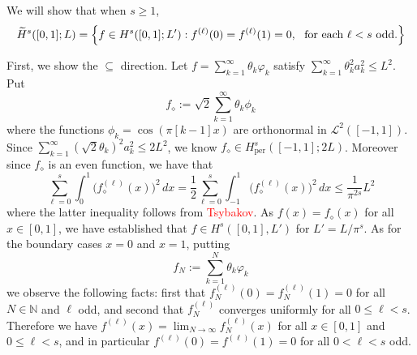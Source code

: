 \documentclass{article}
\newcommand{\1}{\mathbf{1}}
\newcommand{\Nbb}{\mathbb{N}}
\newcommand{\Leb}{\mathcal{L}}
\newcommand{\wt}[1]{\widetilde{#1}}
\theoremstyle{alden}
\theoremstyle{aldenthm}
\theoremstyle{definition}
\theoremstyle{remark}
\begin{document}
We will show that when $s \geq 1$,
\begin{equation*}
\wt{H}^s([0,1];L) = \Bigl\{f \in H^{s}([0,1];L'): f^{(\ell)}(0) = f^{(\ell)}(1) = 0,~~\textrm{for each $\ell < s$ odd.} \Bigr \}
\end{equation*}

First, we show the $\subseteq$ direction. Let $f = \sum_{k = 1}^{\infty} \theta_k \varphi_k$ satisfy $\sum_{k = 1}^{\infty} \theta_k^2 a_k^2 \leq L^2$. Put
\begin{equation*}
f_{\diamond} := \sqrt{2} \sum_{k = 1}^{\infty} \theta_k \phi_k
\end{equation*}
where the functions $\phi_k = \cos(\pi[k - 1]x)$ are orthonormal in $\Leb^2([-1,1])$. Since $\sum_{k = 1}^{\infty} (\sqrt{2}\theta_k)^2 a_k^2 \leq 2L^2$, we know $f_{\diamond} \in H_{\mathrm{per}}^s([-1,1];2L)$. Moreover since $f_{\diamond}$ is an even function, we have that
\begin{equation*}
\sum_{\ell = 0}^{s}\int_{0}^{1} \bigl(f_{\diamond}^{(\ell)}(x)\bigr)^2 \,dx = \frac{1}{2} \sum_{\ell = 0}^{s}\int_{-1}^{1} \bigl(f_{\diamond}^{(\ell)}(x)\bigr)^2 \,dx \leq \frac{1}{\pi^{2s}}L^2
\end{equation*}
where the latter inequality follows from \textcolor{red}{Tsybakov}.
As $f(x) = f_{\diamond}(x)$ for all $x \in [0,1]$, we have established that $f \in H^s([0,1],L')$ for $L' = L/\pi^s$. As for the boundary cases $x = 0$ and $x = 1$, putting
\begin{equation*}
f_N := \sum_{k = 1}^{N} \theta_k \varphi_k
\end{equation*}
we observe the following facts: first that $f_N^{(\ell)}(0) = f_N^{(\ell)}(1) = 0$ for all $N \in \Nbb$ and $\ell$ odd, and second that $f_N^{(\ell)}$ converges uniformly for all $0 \leq \ell < s$. Therefore we have $f^{(\ell)}(x) = \lim_{N \to \infty} f_N^{(\ell)}(x)$ for all $x \in [0,1]$ and $0 \leq \ell < s$, and in particular $f^{(\ell)}(0) = f^{(\ell)}(1) = 0$ for all $0 < \ell < s$ odd. 
\end{document}
